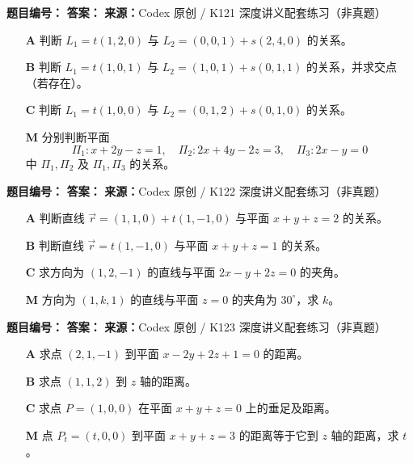 \begin{problemBox}
\begin{problemMeta}
\textbf{题目编号：} \quad
\textbf{答案：} \quad
\textbf{来源：}Codex 原创 / K121 深度讲义配套练习（非真题）
\end{problemMeta}
\begin{enumerate}
  \item[\textbf{A}] 判断
  \(L_1=t(1,2,0)\) 与
  \(L_2=(0,0,1)+s(2,4,0)\) 的关系。
  \item[\textbf{B}] 判断
  \(L_1=t(1,0,1)\) 与
  \(L_2=(1,0,1)+s(0,1,1)\) 的关系，并求交点（若存在）。
  \item[\textbf{C}] 判断
  \(L_1=t(1,0,0)\) 与
  \(L_2=(0,1,2)+s(0,1,0)\) 的关系。
  \item[\textbf{M}] 分别判断平面
  \[
  \Pi_1:x+2y-z=1,\quad
  \Pi_2:2x+4y-2z=3,\quad
  \Pi_3:2x-y=0
  \]
  中 \(\Pi_1,\Pi_2\) 及 \(\Pi_1,\Pi_3\) 的关系。
\end{enumerate}
\end{problemBox}

\begin{problemBox}
\begin{problemMeta}
\textbf{题目编号：} \quad
\textbf{答案：} \quad
\textbf{来源：}Codex 原创 / K122 深度讲义配套练习（非真题）
\end{problemMeta}
\begin{enumerate}
  \item[\textbf{A}] 判断直线
  \(\vec r=(1,1,0)+t(1,-1,0)\) 与平面 \(x+y+z=2\) 的关系。
  \item[\textbf{B}] 判断直线
  \(\vec r=t(1,-1,0)\) 与平面 \(x+y+z=1\) 的关系。
  \item[\textbf{C}] 求方向为 \((1,2,-1)\) 的直线与平面
  \(2x-y+2z=0\) 的夹角。
  \item[\textbf{M}] 方向为 \((1,k,1)\) 的直线与平面 \(z=0\)
  的夹角为 \(30^\circ\)，求 \(k\)。
\end{enumerate}
\end{problemBox}

\begin{problemBox}
\begin{problemMeta}
\textbf{题目编号：} \quad
\textbf{答案：} \quad
\textbf{来源：}Codex 原创 / K123 深度讲义配套练习（非真题）
\end{problemMeta}
\begin{enumerate}
  \item[\textbf{A}] 求点 \((2,1,-1)\) 到平面
  \(x-2y+2z+1=0\) 的距离。
  \item[\textbf{B}] 求点 \((1,1,2)\) 到 \(z\) 轴的距离。
  \item[\textbf{C}] 求点 \(P=(1,0,0)\) 在平面
  \(x+y+z=0\) 上的垂足及距离。
  \item[\textbf{M}] 点 \(P_t=(t,0,0)\) 到平面
  \(x+y+z=3\) 的距离等于它到 \(z\) 轴的距离，求 \(t\)。
\end{enumerate}
\end{problemBox}


